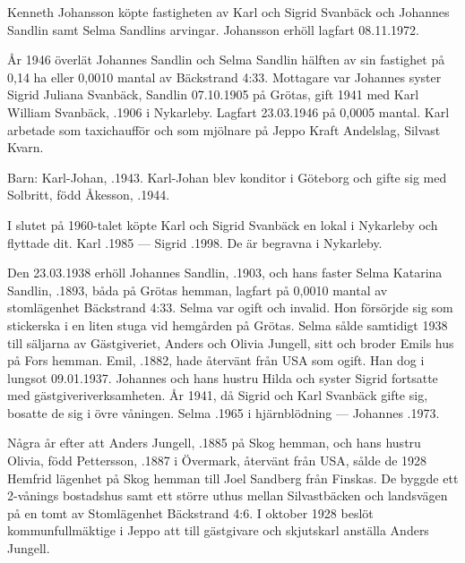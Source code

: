 Kenneth Johansson köpte fastigheten av Karl och Sigrid Svanbäck	och Johannes Sandlin samt Selma Sandlins arvingar. Johansson erhöll lagfart 08.11.1972.


År 1946 överlät Johannes Sandlin och Selma Sandlin hälften av sin	fastighet på 0,14 ha eller 0,0010 mantal av Bäckstrand 4:33. Mottagare	var Johannes syster Sigrid Juliana Svanbäck, \textborn Sandlin	07.10.1905 på Grötas, gift 1941 med Karl William Svanbäck, .1906 i Nykarleby. Lagfart 23.03.1946 på 0,0005 mantal. Karl arbetade som taxichaufför och som mjölnare på Jeppo Kraft Andelslag, Silvast Kvarn.

Barn:	Karl-Johan,	.1943.	Karl-Johan blev konditor i Göteborg och gifte sig med Solbritt, född	Åkesson, .1944.

I slutet på 1960-talet köpte Karl och Sigrid Svanbäck en lokal i Nykarleby och flyttade dit.
Karl .1985  ---  Sigrid .1998. De är	begravna i Nykarleby.


Den 23.03.1938 erhöll Johannes Sandlin, .1903, och hans faster Selma Katarina Sandlin, .1893, båda på Grötas hemman, lagfart på 0,0010 mantal av stomlägenhet Bäckstrand 4:33. Selma var ogift och invalid. Hon försörjde sig som stickerska i en	liten stuga vid hemgården på Grötas. Selma sålde samtidigt 1938	till säljarna av Gästgiveriet, Anders och Olivia Jungell, sitt och broder Emils hus på Fors hemman. Emil, .1882, hade återvänt från USA som ogift. Han dog i lungsot 09.01.1937. Johannes och hans hustru Hilda och syster Sigrid fortsatte med gästgiveriverksamheten. År 1941, då Sigrid och Karl Svanbäck gifte sig, bosatte de sig i övre våningen.
Selma .1965 i hjärnblödning  ---  Johannes .1973.


Några år efter att Anders Jungell, .1885 på Skog hemman,	och hans hustru Olivia, född Pettersson, .1887 i Övermark, återvänt från USA, sålde de 1928 Hemfrid lägenhet på Skog hemman till Joel Sandberg från Finskas. De byggde ett 2-vånings bostadshus samt ett	större uthus mellan Silvastbäcken och landsvägen på en tomt av Stomlägenhet Bäckstrand 4:6. I oktober 1928 beslöt kommunfullmäktige i Jeppo att till gästgivare och skjutskarl anställa Anders Jungell.

